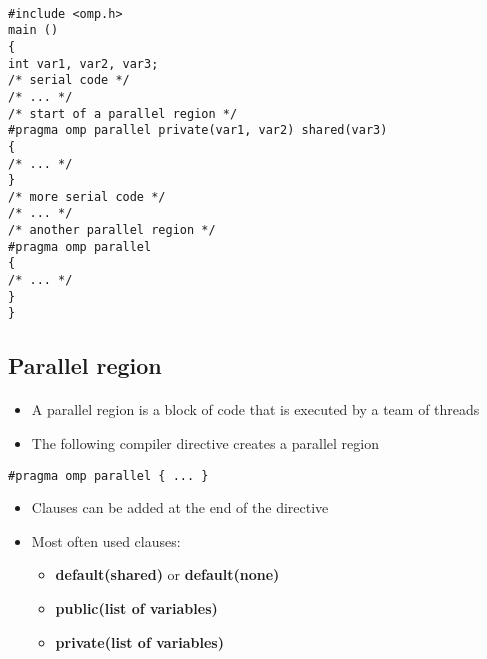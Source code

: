 \documentclass[%
oneside,                 %
final,                   %
10pt]{article}
\begin{document}
\paragraph{}




















\begin{verbatim}
#include <omp.h>
main ()
{
int var1, var2, var3;
/* serial code */
/* ... */
/* start of a parallel region */
#pragma omp parallel private(var1, var2) shared(var3)
{
/* ... */
}
/* more serial code */
/* ... */
/* another parallel region */
#pragma omp parallel
{
/* ... */
}
}

\end{verbatim}



\subsection*{Parallel region}

\paragraph{}
\begin{itemize}
\item A parallel region is a block of code that is executed by a team of threads

\item The following compiler directive creates a parallel region
\end{itemize}

\noindent


\begin{verbatim}
#pragma omp parallel { ... }

\end{verbatim}

\begin{itemize}
\item Clauses can be added at the end of the directive

\item Most often used clauses:
\begin{itemize}

 \item \textbf{default(shared)} or \textbf{default(none)}

 \item \textbf{public(list of variables)}

 \item \textbf{private(list of variables)}
\end{itemize}

\noindent
\end{itemize}
\end{document}
